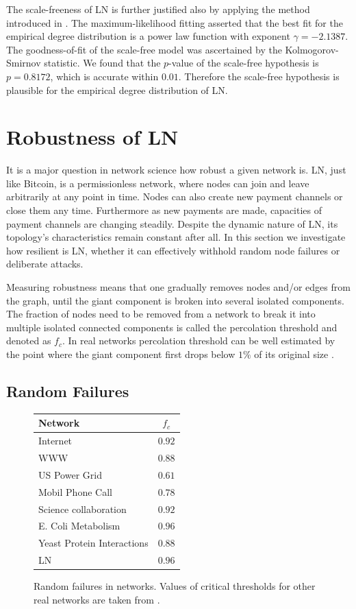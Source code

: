 \documentclass[a4paper]{article}
\theoremstyle{definition}
\begin{document}
The scale-freeness of LN is further justified also by applying the method introduced in \cite{clauset2009power}. The maximum-likelihood fitting asserted that the best fit for the empirical degree distribution is a power law function with exponent $\gamma=-2.1387$. The goodness-of-fit of the scale-free model was ascertained by the Kolmogorov-Smirnov statistic. We found that the $p$-value of the scale-free hypothesis is $p=0.8172$, which is accurate within $0.01$. Therefore the scale-free hypothesis is plausible for the empirical degree distribution of LN.

\section{Robustness of LN}
It is a major question in network science how robust a given network is. LN, just like Bitcoin, is a permissionless network, where nodes can join and leave arbitrarily at any point in time. Nodes can also create new payment channels or close them any time. Furthermore as new payments are made, capacities of payment channels are changing steadily. Despite the dynamic nature of LN, its topology's characteristics remain constant after all.
In this section we investigate how resilient is LN, whether it can effectively withhold random node failures or deliberate attacks.

Measuring robustness means that one gradually removes nodes and/or edges from the graph, until the giant component is broken into several isolated components. The fraction of nodes need to be removed from a network to break it into multiple isolated connected components is called the percolation threshold and denoted as $f_c$. In real networks percolation threshold can be well estimated by the point where the giant component first drops below $1\%$ of its original size \cite{barabasi2016network}.
\subsection{Random Failures}
\begin{figure}
	\begin{tabular}{ | l | c | }
		\hline
		Network & $f_c$  \\ \hline
		Internet & $0.92$  \\ \hline
		WWW & $0.88$ \\ \hline
		US Power Grid & $0.61$  \\ \hline
		Mobil Phone Call & $0.78$ \\ \hline
		Science collaboration& $0.92$ \\ \hline
		E. Coli Metabolism & $0.96$ \\ \hline
		Yeast Protein Interactions & $0.88$ \\ \hline
		LN & $0.96$ \\ \hline
	\end{tabular}
	\caption{Random failures in networks. Values of critical thresholds for other real networks are taken from \cite{barabasi2016network}.}\label{fig:randfailures}
\end{figure}
\end{document}
